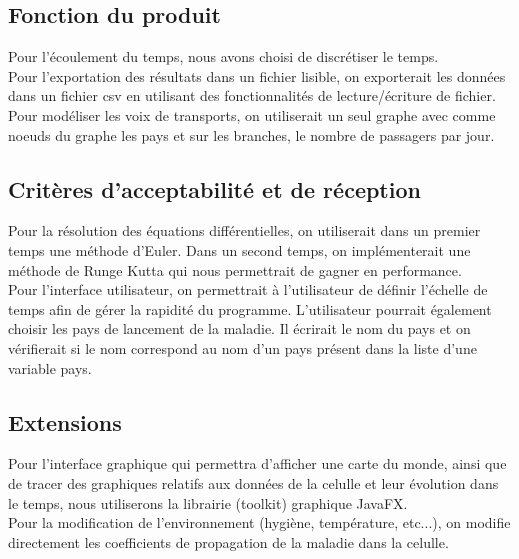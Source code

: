\documentclass[12pt,a4paper]{report}
\begin{document}
\subsection*{Fonction du produit}
	\begin{flushleft}
	Pour l'écoulement du temps, nous avons choisi de discrétiser le temps. \\
	Pour l'exportation des résultats dans un fichier lisible, on exporterait les données dans un fichier csv en utilisant des fonctionnalités de lecture/écriture de fichier.\\
	Pour modéliser les voix de transports, on utiliserait un seul graphe avec comme noeuds du graphe les pays et sur les branches, le nombre de passagers par jour.
	\end{flushleft}

\subsection*{Critères d'acceptabilité et de réception}
\begin{flushleft}
	Pour la résolution des équations différentielles, on utiliserait dans un premier temps une méthode d'Euler. Dans un second temps, on implémenterait une méthode de Runge Kutta qui nous permettrait de gagner en performance. \\
	Pour l'interface utilisateur, on permettrait à l'utilisateur de définir l'échelle de temps afin de gérer la rapidité du programme. L'utilisateur pourrait également choisir les pays de lancement de la maladie. Il écrirait le nom du pays et on vérifierait si le nom correspond au nom d'un pays présent dans la liste d'une variable pays.
\end{flushleft}

\subsection*{Extensions}
\begin{flushleft}
 	Pour l'interface graphique qui permettra d'afficher une carte du monde, ainsi que de tracer des graphiques relatifs aux données de la celulle et leur évolution dans le temps, nous utiliserons la librairie (toolkit) graphique JavaFX. \\
	Pour la modification de l'environnement (hygiène, température, etc...), on modifie directement les coefficients de propagation de la maladie dans la celulle.
\end{flushleft}
\end{document}
